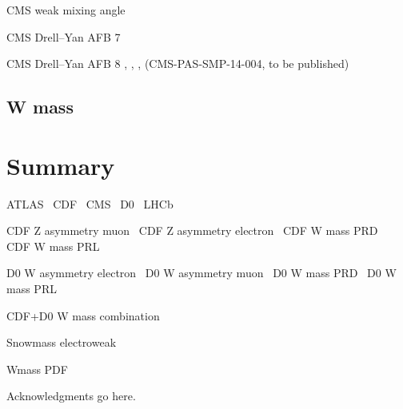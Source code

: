 \documentclass[12pt]{iopart}
\begin{document}
CMS weak mixing angle~\cite{Chatrchyan:2011ya}

CMS Drell--Yan AFB 7 \TeV~\cite{Chatrchyan:2012dc}

CMS Drell--Yan AFB 8 \TeV, \gz, \kz, \lz (CMS-PAS-SMP-14-004, to be published)

\subsection{W mass}

\section{Summary}


ATLAS~\cite{Aad:2008zzm}
CDF~\cite{Abulencia:2005ix}
CMS~\cite{CMSdetector}
D0~\cite{Abazov:2005pn}
LHCb~\cite{Alves:2008zz}

CDF Z asymmetry muon~\cite{Aaltonen:2014loa}
CDF Z asymmetry electron~\cite{Aaltonen:2013wcp}
CDF W mass PRD~\cite{Aaltonen:2013vwa}
CDF W mass PRL~\cite{Aaltonen:2012bp}

D0 W asymmetry electron~\cite{Abazov:2013dsa}
D0 W asymmetry muon~\cite{Abazov:2013rja}
D0 W mass PRD~\cite{D0:2013jba}
D0 W mass PRL~\cite{Abazov:2012bv}

CDF+D0 W mass combination~\cite{Aaltonen:2013iut}

Snowmass electroweak~\cite{Baak:2013fwa}

Wmass PDF~\cite{Bozzi:2011ww}

\ack
Acknowledgments go here.



\end{document}
